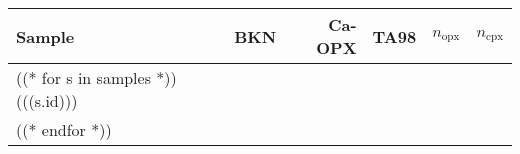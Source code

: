 \begin{tabular}{l r r r r r}
\hline
 Sample  & BKN & Ca-OPX & TA98 & $n_\textrm{opx}$ & $n_\textrm{cpx}$  \\
\hline
((* for s in samples *))
  (((s.id))) & & & & & \\
((* endfor *))
\hline
\end{tabular}
